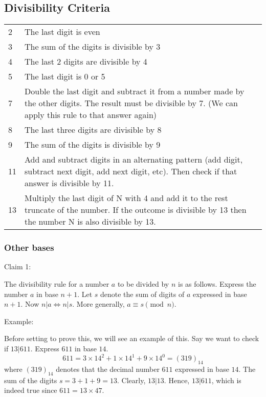 \subsection{Divisibility Criteria}

\begin{table}[]
  \begin{tabular}{ll}
    2  & The last digit is even                                                                                                                                          \\
    3  & The sum of the digits is divisible by 3                                                                                                                         \\
    4  & The last 2 digits are divisible by 4                                                                                                                            \\
    5  & The last digit is 0 or 5                                                                                                                                        \\
    7  & Double the last digit and subtract it from a number made by the other digits. The result must be divisible by 7. (We can apply this rule to that answer again)  \\
    8  & The last three digits are divisible by 8                                                                                                                        \\
    9  & The sum of the digits is divisible by 9                                                                                                                         \\
    11 & Add and subtract digits in an alternating pattern (add digit, subtract next digit, add next digit, etc). Then check if that answer is divisible by 11.          \\
    13 & Multiply the last digit of N with 4 and add it to the rest truncate of the number. If the outcome is divisible by 13 then the number N is also divisible by 13.
  \end{tabular}
\end{table}

\subsubsection{Other bases}

Claim 1:

The divisibility rule for a number $a$ to be divided by $n$ is as follows. Express the number $a$ in base $n+1$. Let $s$ denote the sum of digits of $a$ expressed in base $n+1$. Now $n|a \iff n|s$. More generally, $a \equiv s \pmod{n}$.

Example:

Before setting to prove this, we will see an example of this. Say we want to check if $13|611$. Express $611$ in base $14$.
$$ 611 = 3 \times 14^2 + 1 \times 14^1 + 9 \times 14^0 = (319)_{14} $$
where $(319)_{14}$ denotes that the decimal number $611$ expressed in base $14$. The sum of the digits $s = 3 + 1 + 9 = 13$. Clearly, $13|13$. Hence, $13|611$, which is indeed true since $611 = 13 \times 47$.